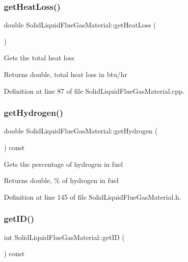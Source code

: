 \subsubsection{\texorpdfstring{get\+Heat\+Loss()}{getHeatLoss()}}
{\footnotesize\ttfamily double Solid\+Liquid\+Flue\+Gas\+Material\+::get\+Heat\+Loss (\begin{DoxyParamCaption}{ }\end{DoxyParamCaption})}

Gets the total heat loss \begin{DoxyReturn}{Returns}
double, total heat loss in btu/hr 
\end{DoxyReturn}


Definition at line 87 of file Solid\+Liquid\+Flue\+Gas\+Material.\+cpp.

\mbox{\label{class_solid_liquid_flue_gas_material_a26af2edd53c50b071648d03bc6442fb6}} 
\subsubsection{\texorpdfstring{get\+Hydrogen()}{getHydrogen()}}
{\footnotesize\ttfamily double Solid\+Liquid\+Flue\+Gas\+Material\+::get\+Hydrogen (\begin{DoxyParamCaption}{ }\end{DoxyParamCaption}) const\hspace{0.3cm}{\ttfamily [inline]}}

Gets the percentage of hydrogen in fuel \begin{DoxyReturn}{Returns}
double, \% of hydrogen in fuel 
\end{DoxyReturn}


Definition at line 145 of file Solid\+Liquid\+Flue\+Gas\+Material.\+h.

\mbox{\label{class_solid_liquid_flue_gas_material_afb124b546137da7ba99e31616198e0c8}} 
\subsubsection{\texorpdfstring{get\+I\+D()}{getID()}}
{\footnotesize\ttfamily int Solid\+Liquid\+Flue\+Gas\+Material\+::get\+ID (\begin{DoxyParamCaption}{ }\end{DoxyParamCaption}) const\hspace{0.3cm}{\ttfamily [inline]}}

